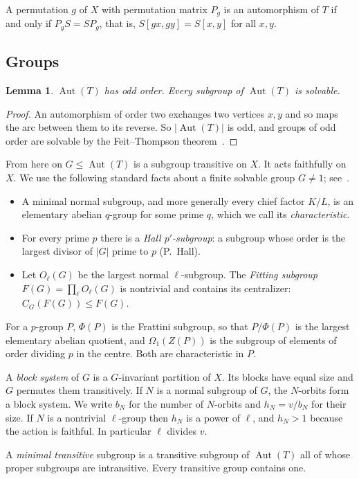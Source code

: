 \documentclass[11pt]{amsart}
\newtheorem{lemma}[theorem]{Lemma}
\theoremstyle{definition}
\theoremstyle{remark}
\newcommand{\Aut}{\operatorname{Aut}}
\begin{document}
A permutation $g$ of $X$ with permutation matrix $P_g$ is an automorphism of $T$ if and only if $P_gS=SP_g$, that is, $S[gx,gy]=S[x,y]$ for all $x,y$.

\subsection{Groups}
\begin{lemma}\label{lem:odd}
$\Aut(T)$ has odd order. Every subgroup of $\Aut(T)$ is solvable.
\end{lemma}
\begin{proof}
An automorphism of order two exchanges two vertices $x,y$ and so maps the arc between them to its reverse. So $|\Aut(T)|$ is odd, and groups of odd order are solvable by the Feit--Thompson theorem~\cite{FT63}.
\end{proof}

From here on $G\le\Aut(T)$ is a subgroup transitive on $X$. It acts faithfully on $X$. We use the following standard facts about a finite solvable group $G\neq1$; see~\cite{Gorenstein}.
\begin{itemize}
\item A minimal normal subgroup, and more generally every chief factor $K/L$, is an elementary abelian $q$-group for some prime $q$, which we call its \emph{characteristic}.
\item For every prime $p$ there is a \emph{Hall $p'$-subgroup}: a subgroup whose order is the largest divisor of $|G|$ prime to $p$ (P.~Hall).
\item Let $O_\ell(G)$ be the largest normal $\ell$-subgroup. The \emph{Fitting subgroup} $F(G)=\prod_\ell O_\ell(G)$ is nontrivial and contains its centralizer: $C_G(F(G))\le F(G)$.
\end{itemize}
For a $p$-group $P$, $\Phi(P)$ is the Frattini subgroup, so that $P/\Phi(P)$ is the largest elementary abelian quotient, and $\Omega_1(Z(P))$ is the subgroup of elements of order dividing $p$ in the centre. Both are characteristic in $P$.

A \emph{block system} of $G$ is a $G$-invariant partition of $X$. Its blocks have equal size and $G$ permutes them transitively. If $N$ is a normal subgroup of $G$, the $N$-orbits form a block system. We write $b_N$ for the number of $N$-orbits and $h_N=v/b_N$ for their size. If $N$ is a nontrivial $\ell$-group then $h_N$ is a power of $\ell$, and $h_N>1$ because the action is faithful. In particular $\ell$ divides $v$.

A \emph{minimal transitive} subgroup is a transitive subgroup of $\Aut(T)$ all of whose proper subgroups are intransitive. Every transitive group contains one.
\end{document}
